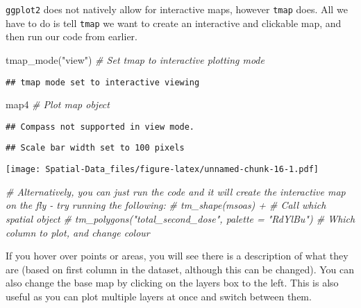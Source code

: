 \documentclass[
]{book}
\newenvironment{Shaded}{\begin{snugshade}}{\end{snugshade}}
\newcommand{\CommentTok}[1]{\textcolor[rgb]{0.56,0.35,0.01}{\textit{#1}}}
\newcommand{\FunctionTok}[1]{\textcolor[rgb]{0.00,0.00,0.00}{#1}}
\newcommand{\NormalTok}[1]{#1}
\newcommand{\StringTok}[1]{\textcolor[rgb]{0.31,0.60,0.02}{#1}}
\begin{document}
\texttt{ggplot2} does not natively allow for interactive maps, however \texttt{tmap} does. All we have to do is tell \texttt{tmap} we want to create an interactive and clickable map, and then run our code from earlier.

\begin{Shaded}
\begin{Highlighting}[]
\FunctionTok{tmap\_mode}\NormalTok{(}\StringTok{"view"}\NormalTok{) }\CommentTok{\# Set tmap to interactive plotting mode}
\end{Highlighting}
\end{Shaded}

\begin{verbatim}
## tmap mode set to interactive viewing
\end{verbatim}

\begin{Shaded}
\begin{Highlighting}[]
\NormalTok{map4 }\CommentTok{\# Plot map object}
\end{Highlighting}
\end{Shaded}

\begin{verbatim}
## Compass not supported in view mode.
\end{verbatim}

\begin{verbatim}
## Scale bar width set to 100 pixels
\end{verbatim}

\texttt{[image: Spatial-Data\_files/figure-latex/unnamed-chunk-16-1.pdf]}

\begin{Shaded}
\begin{Highlighting}[]
\CommentTok{\# Alternatively, you can just run the code and it will create the interactive map on the fly {-} try running the following:}
\CommentTok{\# tm\_shape(msoas) + \# Call which spatial object}
\CommentTok{\#   tm\_polygons("total\_second\_dose", palette = "RdYlBu") \# Which column to plot, and change colour}
\end{Highlighting}
\end{Shaded}

If you hover over points or areas, you will see there is a description of what they are (based on first column in the dataset, although this can be changed). You can also change the base map by clicking on the layers box to the left. This is also useful as you can plot multiple layers at once and switch between them.
\end{document}
